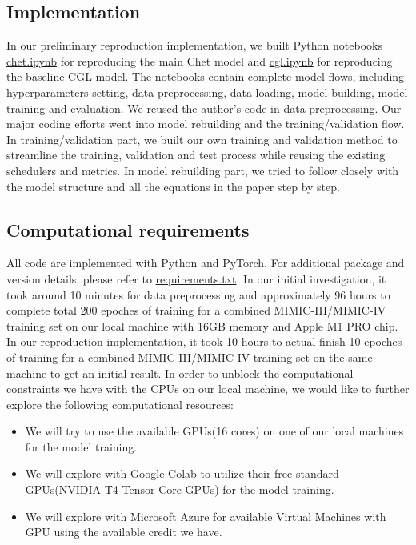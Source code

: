 \documentclass[11pt,a4paper,fleqn]{article}
\begin{document}
\subsection{Implementation}
In our preliminary reproduction implementation, we built Python notebooks
\href{https://github.com/willtsai/dlh-sp23-team53/blob/main/chet.ipynb}{chet.ipynb} 
for reproducing the main Chet model and 
\href{https://github.com/willtsai/dlh-sp23-team53/blob/main/cgl.ipynb}{cgl.ipynb}
for reproducing the baseline CGL model. The notebooks contain complete model
flows, including hyperparameters setting, data preprocessing, data loading,
model building, model training and evaluation. We reused the
\href{https://github.com/LuChang-CS/Chet}{author's code} in data preprocessing.
Our major coding efforts went into model rebuilding and the training/validation
flow. In training/validation part, we built our own training and validation
method to streamline the training, validation and test process while reusing the
existing schedulers and metrics. In model rebuilding part, we tried to follow
closely with the model structure and all the equations in the paper step by
step.

\subsection{Computational requirements}
All code are implemented with Python and PyTorch. For additional package and
version details, please refer to
\href{https://github.com/willtsai/dlh-sp23-team53/blob/main/requirements.txt}{requirements.txt}.
In our initial investigation, it took around 10 minutes for data preprocessing
and approximately 96 hours to complete total 200 epoches of training for a
combined MIMIC-III/MIMIC-IV training set on our local machine with 16GB memory
and Apple M1 PRO chip. In our reproduction implementation, it took 10 hours to
actual finish 10 epoches of training for a combined MIMIC-III/MIMIC-IV training
set on the same machine to get an initial result. In order to unblock the
computational constraints we have with the CPUs on our local machine, we would
like to further explore the following computational resources:
\begin{itemize}
  \item We will try to use the available GPUs(16 cores) on one of our local
  machines for the model training.
  \item We will explore with Google Colab to utilize their free standard
  GPUs(NVIDIA T4 Tensor Core GPUs) for the model training.
  \item We will explore with Microsoft Azure for available Virtual Machines with
  GPU using the available credit we have.
\end{itemize}
\end{document}
